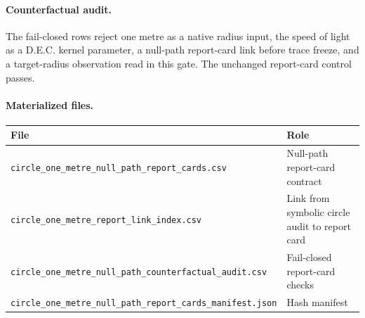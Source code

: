 \paragraph{Counterfactual audit.}
The fail-closed rows reject one metre as a native radius input, the speed of light as a D.E.C. kernel parameter, a null-path report-card link before trace freeze, and a target-radius observation read in this gate.  The unchanged report-card control passes.

\paragraph{Materialized files.}
\begin{center}
\small
\begin{tabular}{ll}
\toprule
File & Role\\
\midrule
\texttt{circle\_one\_metre\_null\_path\_report\_cards.csv} & Null-path report-card contract\\
\texttt{circle\_one\_metre\_report\_link\_index.csv} & Link from symbolic circle audit to report card\\
\texttt{circle\_one\_metre\_null\_path\_counterfactual\_audit.csv} & Fail-closed report-card checks\\
\texttt{circle\_one\_metre\_null\_path\_report\_cards\_manifest.json} & Hash manifest\\
\bottomrule
\end{tabular}
\end{center}
